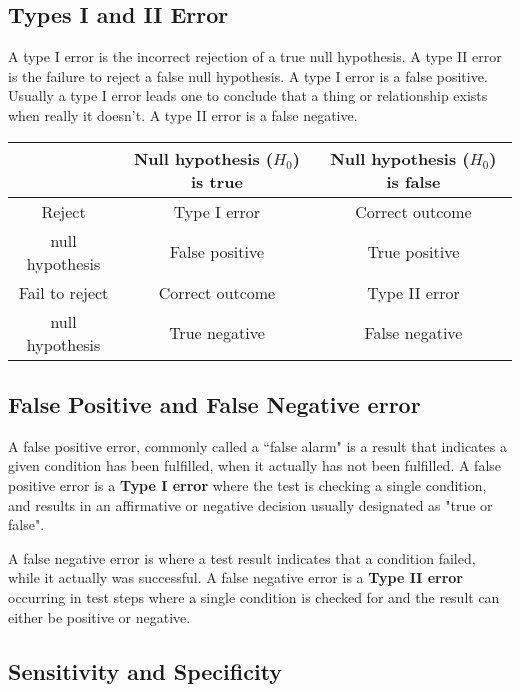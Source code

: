\subsection{Types I and II Error}
A type I error is the incorrect rejection of a true null hypothesis.
A type II error is the failure to reject a false null hypothesis.
A type I error is a false positive. Usually a type I error leads one to conclude that a thing
or relationship exists when really it doesn't.
A type II error is a false negative.
\begin{tabular}{|c|c|c|}
  \hline

& Null hypothesis ($H_0$) is true	& Null hypothesis ($H_0$) is false\\ \hline
Reject  & Type I error          & Correct outcome \\
null hypothesis 			& False positive	& True positive\\ \hline
Fail to reject 	&Correct outcome&Type II error\\
null hypothesis & True negative	& False negative\\
  \hline
\end{tabular}
\subsection{False Positive and False Negative error}

A false positive error, commonly called a ``false alarm" is a result that indicates a
given condition has been fulfilled, when it actually has not been fulfilled.
A false positive error is a \textbf{Type I error} where the test is checking a single condition,
and results in an affirmative or negative decision usually designated as "true or false".

A false negative error is where a test result indicates that a condition failed, while it actually was successful.
A false negative error is a \textbf{Type II error} occurring in test steps where a single
condition is checked for and the result can either be positive or negative.




\subsection{Sensitivity and Specificity}

